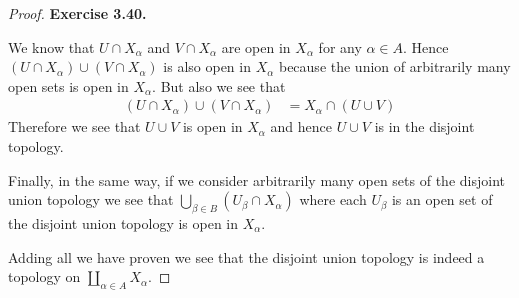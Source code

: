 \documentclass[11pt]{article}
\theoremstyle{definition}
\begin{document}
\begin{proof}{\textbf{Exercise 3.40.}}
\begin{itemize}
        We know that $U \cap X_\alpha$ and $V \cap X_\alpha$ are open in
        $X_\alpha$ for any $\alpha \in A$. Hence 
        $(U \cap X_\alpha) \cup (V \cap X_\alpha)$
        is also open in $X_\alpha$ because the union
        of arbitrarily many open sets is open in $X_\alpha$.
        But also we see that
        \begin{align*}
            (U \cap X_\alpha) \cup (V \cap X_\alpha)
            &= X_\alpha \cap (U \cup V)
        \end{align*}
        Therefore we see that $U \cup V$ is open in $X_\alpha$ and hence
        $U \cup V$ is in the disjoint topology.
        
        Finally, in the same way, if we consider arbitrarily
        many open sets of the disjoint union topology we see that
        $\bigcup_{\beta \in B} (U_\beta \cap X_\alpha)$ where each $U_\beta$
        is an open set of the disjoint union topology is open in $X_\alpha$.
    \end{itemize}
    Adding all we have proven we see that the disjoint union topology is indeed
    a topology on $\coprod_{\alpha \in A} X_\alpha$.
\end{proof}
\cleardoublepage
\end{document}
